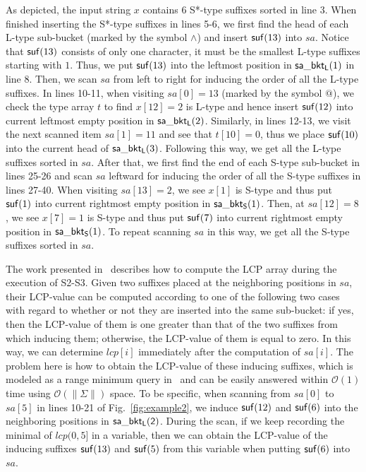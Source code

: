 \documentclass[10pt,journal,compsoc]{IEEEtran}
\begin{document}
As depicted, the input string $x$ contains 6 S*-type suffixes sorted in line 3. When finished inserting the S*-type suffixes in lines 5-6, we first find the head of each L-type sub-bucket (marked by the symbol $\wedge$) and insert ${\sf suf}(13)$ into $sa$. Notice that ${\sf suf}(13)$ consists of only one character, it must be the smallest L-type suffixes starting with $1$. Thus, we put ${\sf suf}(13)$ into the leftmost position in ${\sf sa\_bkt_L}(1)$ in line 8. Then, we scan $sa$ from left to right for inducing the order of all the L-type suffixes. In lines 10-11, when visiting $sa[0] = 13$ (marked by the symbol $@$), we check the type array $t$ to find $x[12] = 2$ is L-type and hence insert ${\sf suf}(12)$ into current leftmost empty position in ${\sf sa\_bkt_L}(2)$. Similarly, in lines 12-13, we visit the next scanned item $sa[1] = 11$ and see that $t[10] = 0$, thus we place ${\sf suf}(10)$ into the current head of ${\sf sa\_bkt_L}(3)$. Following this way, we get all the L-type suffixes sorted in $sa$. After that, we first find the end of each S-type sub-bucket in lines 25-26 and scan $sa$ leftward for inducing the order of all the S-type suffixes in lines 27-40. When visiting $sa[13] = 2$, we see $x[1]$ is S-type and thus put ${\sf suf}(1)$ into current rightmost empty position in ${\sf sa\_bkt_S}(1)$. Then, at $sa[12] = 8$, we see $x[7] = 1$ is S-type and thus put ${\sf suf}(7)$ into current rightmost empty position in ${\sf sa\_bkt_S}(1)$. To repeat scanning $sa$ in this way, we get all the S-type suffixes sorted in $sa$. 

The work presented in~\cite{Fischer11} describes how to compute the LCP array during the execution of S2-S3. Given two suffixes placed at the neighboring positions in $sa$, their LCP-value can be computed according to one of the following two cases with regard to whether or not they are inserted into the same sub-bucket: if yes, then the LCP-value of them is one greater than that of the two suffixes from which inducing them; otherwise, the LCP-value of them is equal to zero. In this way, we can determine $lcp[i]$ immediately after the computation of $sa[i]$. The problem here is how to obtain the LCP-value of these inducing suffixes, which is modeled as a range minimum query in~\cite{Fischer11} and can be easily answered within $\mathcal{O}(1)$ time using $\mathcal{O}(\|\Sigma\|)$ space. To be specific, when scanning from $sa[0]$ to $sa[5]$ in lines 10-21 of Fig.~\ref{fig:example2}, we induce ${\sf suf}(12)$ and ${\sf suf}(6)$ into the neighboring positions in ${\sf sa\_bkt_L(2)}$. During the scan, if we keep recording the minimal of $lcp(0, 5]$ in a variable, then we can obtain the LCP-value of the inducing suffixes ${\sf suf}(13)$ and ${\sf suf}(5)$ from this variable when putting ${\sf suf}(6)$ into $sa$. 
\end{document}
